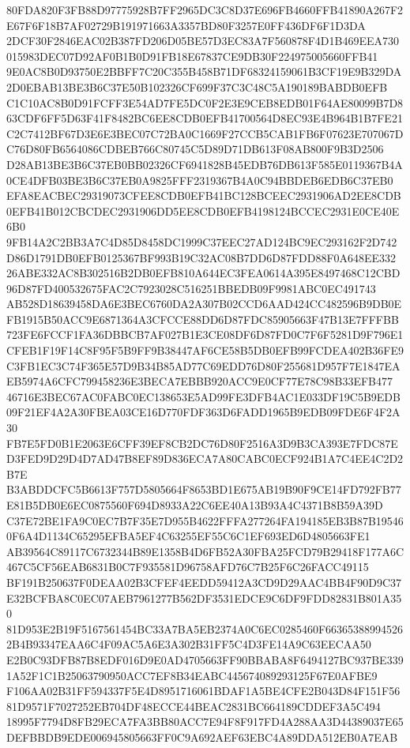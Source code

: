 \documentclass[UTF8,fontset=fandol,zihao=-4,a4paper]{ctexart}
\begin{document}
{{80FDA820F3FB88D97775928B7FF2965DC3C8D37E696FB4660FFB41890A267F2E67F6F18B7AF02729B191971663A3357BD80F3257E0FF436DF6F1D3DA
2DCF30F2846EAC02B387FD206D05BE57D3EC83A7F560878F4D1B469EEA730015983DEC07D92AF0B1B0D91FB18E67837CE9DB30F224975005660FFB41
9E0AC8B0D93750E2BBFF7C20C355B458B71DF68324159061B3CF19E9B329DA2D0EBAB13BE3B6C37E50B102326CF699F37C3C48C5A190189BABDB0EFB
C1C10AC8B0D91FCFF3E54AD7FE5DC0F2E3E9CEB8EDB01F64AE80099B7D863CDF6FF5D63F41F8482BC6EE8CDB0EFB41700564D8EC93E4B964B1B7FE21
C2C7412BF67D3E6E3BEC07C72BA0C1669F27CCB5CAB1FB6F07623E707067DC76D80FB6564086CDBEB766C80745C5D89D71DB613F08AB800F9B3D2506
D28AB13BE3B6C37EB0BB02326CF6941828B45EDB76DB613F585E0119367B4A0CE4DFB03BE3B6C37EB0A9825FFF2319367B4A0C94BBDEB6EDB6C37EB0
EFA8EACBEC29319073CFEE8CDB0EFB41BC128BCEEC2931906AD2EE8CDB0EFB41B012CBCDEC2931906DD5EE8CDB0EFB4198124BCCEC2931E0CE40E6B0
9FB14A2C2BB3A7C4D85D8458DC1999C37EEC27AD124BC9EC293162F2D742D86D1791DB0EFB0125367BF993B19C32AC08B7DD6D87FDD88F0A648EE332
26ABE332AC8B302516B2DB0EFB810A644EC3FEA0614A395E8497468C12CBD96D87FD400532675FAC2C7923028C516251BBEDB09F9981ABC0EC491743
AB528D18639458DA6E3BEC6760DA2A307B02CCD6AAD424CC482596B9DB0EFB1915B50ACC9E6871364A3CFCCE88DD6D87FDC85905663F47B13E7FFFBB
723FE6FCCF1FA36DBBCB7AF027B1E3CE08DF6D87FD0C7F6F5281D9F796E1CFEB1F19F14C8F95F5B9FF9B38447AF6CE58B5DB0EFB99FCDEA402B36FE9
C3FB1EC3C74F365E57D9B34B85AD77C69EDD76D80F255681D957F7E1847EAEB5974A6CFC799458236E3BECA7EBBB920ACC9E0CF77E78C98B33EFB477
46716E3BEC67AC0FABC0EC138653E5AD99FE3DFB4AC1E033DF19C5B9EDB09F21EF4A2A30FBEA03CE16D770FDF363D6FADD1965B9EDB09FDE6F4F2A30
FB7E5FD0B1E2063E6CFF39EF8CB2DC76D80F2516A3D9B3CA393E7FDC87ED3FED9D29D4D7AD47B8EF89D836ECA7A80CABC0ECF924B1A7C4EE4C2D2B7E
B3ABDDCFC5B6613F757D5805664F8653BD1E675AB19B90F9CE14FD792FB77E81B5DB0E6EC0875560F694D8933A22C6EE40A13B93A4C4371B8B59A39D
C37E72BE1FA9C0EC7B7F35E7D955B4622FFFA277264FA194185EB3B87B195460F6A4D1134C65295EFBA5EF4C63255EF55C6C1EF693ED6D4805663FE1
AB39564C89117C6732344B89E1358B4D6FB52A30FBA25FCD79B29418F177A6C467C5CF56EAB6831B0C7F935581D96758AFD76C7B25F6C26FACC49115
BF191B250637F0DEAA02B3CFEF4EEDD59412A3CD9D29AAC4BB4F90D9C37E32BCFBA8C0EC07AEB7961277B562DF3531EDCE9C6DF9FDD82831B801A350
81D953E2B19F5167561454BC33A7BA5EB2374A0C6EC0285460F663653889945262B4B93347EAA6C4F09AC5A6E3A302B31FF5C4D3FE14A9C63EECAA50
E2B0C93DFB87B8EDF016D9E0AD4705663FF90BBABA8F6494127BC937BE3391A52F1C1B25063790950ACC7EF8B34EABC445674089293125F67E0AFBE9
F106AA02B31FF594337F5E4D8951716061BDAF1A5BE4CFE2B043D84F151F5681D9571F7027252EB704DF48ECCE44BEAC2831BC664189CDDEF3A5C494
18995F7794D8FB29ECA7FA3BB80ACC7E94F8F917FD4A288AA3D44389037E65DEFBBDB9EDE006945805663FF0C9A692AEF63EBC4A89DDA512EB0A7EAB
}}
\end{document}

